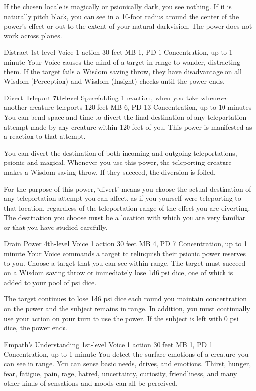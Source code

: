   If the chosen locale is magically or psionically dark,
  you see nothing.
  If it is naturally pitch black,
  you can see in a 10-foot radius around the center
  of the power's effect or out to the extent
  of your natural darkvision.
  The power does not work across planes.

\DndPowerHeader%
  {Distract}
  {1st-level Voice}
  {1 action}
  {30 feet}
  {MB 1, PD 1}
  {Concentration, up to 1 minute}
Your Voice causes the mind of a target in range to wander,
distracting them.
If the target fails a Wisdom saving throw,
they have disadvantage on all Wisdom (Perception)
and Wisdom (Insight) checks until the power ends.

\DndPowerHeader%
  {Divert Teleport}
  {7th-level Spacefolding}
  {1 reaction, when you take whenever another creature
  teleports}
  {120 feet}
  {MB 6, PD 13}
  {Concentration, up to 10 minutes}
  You can bend space and time to
  divert the final destination of any teleportation attempt
  made by any creature within 120 feet of you.
  This power is manifested as a reaction to that attempt.

  You can divert the destination of both incoming and outgoing
  teleportations,
  psionic and magical.
  Whenever you use this power,
  the teleporting creature makes a Wisdom saving throw.
  If they succeed, the diversion is foiled.
  
  For the purpose of this power,
  `divert' means you choose the actual destination
  of any teleportation attempt you can affect,
  as if you yourself were teleporting to that location,
  regardless of the teleportation range
  of the effect you are diverting.
  The destination you choose must be a location
  with which you are very familiar
  or that you have studied carefully.
  
\DndPowerHeader%
  {Drain Power}
  {4th-level Voice}
  {1 action}
  {30 feet}
  {MB 4, PD 7}
  {Concentration, up to 1 minute}
Your Voice commands a target to relinquish their psionic power
reserves to you.
Choose a target that you can see within range.
The target must succeed on a Wisdom saving throw
or immediately lose 1d6 psi dice, one of which is added
to your pool of psi dice.

The target continues to lose 1d6 psi dice each round you
maintain concentration on the power and the subject remains
in range.
In addition, you must continually use your action on your turn
to use the power.
If the subject is left with 0 psi dice, the power ends.

\DndPowerHeader%
  {Empath's Understanding}
  {1st-level Voice}
  {1 action}
  {30 feet}
  {MB 1, PD 1}
  {Concentration, up to 1 minute}
You detect the surface emotions of a creature you can see in range.
You can sense basic needs, drives, and emotions.
Thirst, hunger, fear, fatigue, pain, rage, hatred, uncertainty,
curiosity, friendliness, and many other kinds of sensations and moods
can all be perceived.

